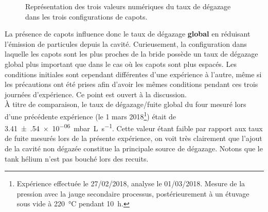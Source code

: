 \begin{figure}
    \centering
    \caption{Représentation des trois valeurs numériques du taux de dégazage dans les trois configurations de capots.}
    \label{fig:pdfStatique}
\end{figure}

La présence de capots influence donc le taux de dégazage \textbf{global} en réduisant l'émission de particules depuis la cavité. Curieusement, la configuration dans laquelle les capots sont les plus proches de la bride possède un taux de dégazage global plus important que dans le cas où les capots sont plus espacés. Les conditions initiales sont cependant différentes d'une expérience à l'autre, même si les précautions ont été prises afin d'avoir les mêmes conditions pendant ces trois journées d'expérience. Ce point est ouvert à la discussion.\\
À titre de comparaison, le taux de dégazage/fuite global du four mesuré lors d'une précédente expérience (le 1\ier{} mars 2018\footnote{Expérience effectuée le 27/02/2018, analyse le 01/03/2018. Mesure de la pression avec la jauge secondaire processus, postérieurement à un étuvage sous vide à \SI{220}{\celsius} pendant \SI{10}{\hour}.}) était de \SI{3.41(54)e-06}{\milli\bar.\liter\per\second}. Cette valeur étant faible par rapport aux taux de fuite mesurés lors de la présente expérience, on voit très clairement que l'ajout de la cavité non dégazée constitue la principale source de dégazage. Notons que le tank hélium n'est pas bouché lors des recuits.

